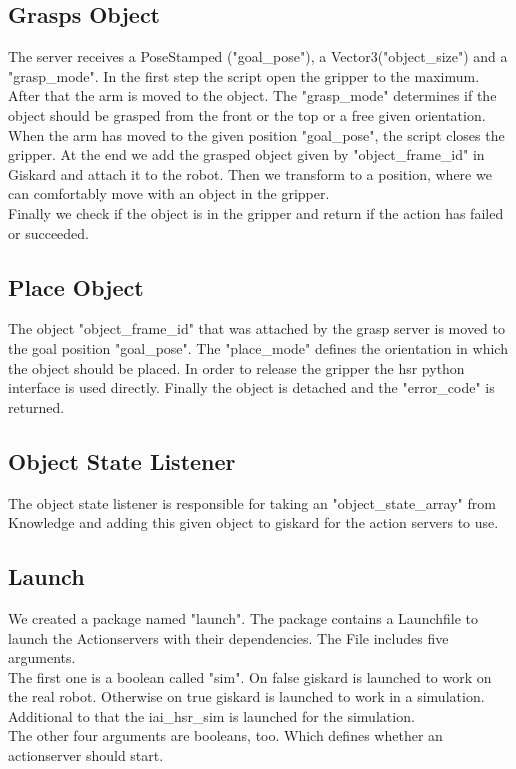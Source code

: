 \documentclass[main.tex]{subfiles}
\begin{document}
	\vspace{1cm}
	
	\subsection{Grasps Object}
	The server receives a PoseStamped ("goal\_pose"), a Vector3("object\_size") and a "grasp\_mode". In the first step the script open the gripper to the maximum. After that the arm is moved to the object. The "grasp\_mode" determines if the object should be grasped from the front or the top or a free given orientation. When the arm has moved to the given position "goal\_pose", the script closes the gripper. At the end we add the grasped object given by "object\_frame\_id" in Giskard and attach it to the robot. Then we transform to a position, where we can comfortably move with an object in the gripper.\\
	Finally we check if the object is in the gripper and return if the action has failed or succeeded.
	
	\vspace{1cm}
	
	\subsection{Place Object}
	The object "object\_frame\_id" that was attached by the grasp server is moved to the goal position "goal\_pose". The "place\_mode" defines the orientation in which the object should be placed. In order to release the gripper the hsr python interface is used directly. Finally the object is detached and the "error\_code" is returned.
	
	\vspace{1cm}
	
	\subsection{Object State Listener}
	The object state listener is responsible for taking an "object\_state\_array" from Knowledge and adding this given object to giskard for the action servers to use.
	
	\vspace{1cm}
	
	\subsection{Launch}
	We created a package named "launch". The package contains a Launchfile to launch the Actionservers with their dependencies. The File includes five arguments.\\
	The first one is a boolean called "sim". On false giskard is launched to work on the real robot. Otherwise on true giskard is launched to work in a simulation. Additional to that the iai\_hsr\_sim is launched for the simulation.\\
	The other four arguments are booleans, too. Which defines whether an actionserver should start. 
\end{document}
